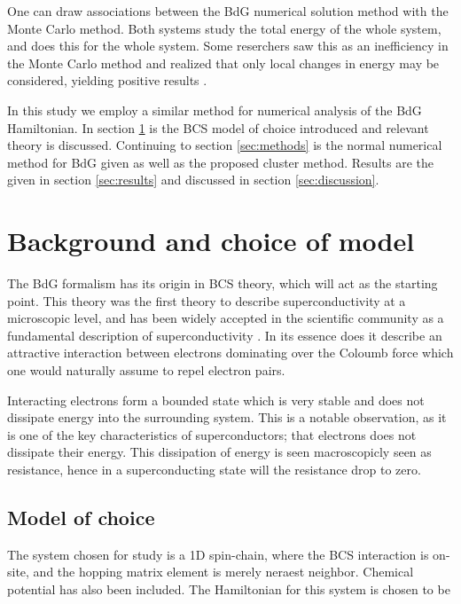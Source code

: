 \documentclass[11pt]{article}
\begin{document}
One can draw associations between the BdG numerical solution method with the Monte Carlo method. Both systems study the total energy of the whole system, and does this for the whole system. Some reserchers saw this as an inefficiency in the Monte Carlo method and realized that only local changes in energy may be considered, yielding positive results \cite{karmakarDisorderStabilizedBreachedpair2022, kumarTravellingClusterApproximation2006}.

In this study we employ a similar method for numerical analysis of the BdG Hamiltonian. In section \ref{sec:background} is the BCS model of choice introduced and relevant theory is discussed. Continuing to section \ref{sec:methods} is the normal numerical method for BdG given as well as the proposed cluster method. Results are the given in section \ref{sec:results} and discussed in section \ref{sec:discussion}.  


\section{Background and choice of model}\label{sec:background}

The BdG formalism has its origin in BCS theory, which will act as the starting point. This theory was the first theory to describe superconductivity at a microscopic level, and has been widely accepted in the scientific community as a fundamental description of superconductivity \cite{girvinModernCondensedMatter2019, sharmaReviewTheoriesSuperconductivity2015}. In its essence does it describe an attractive interaction between electrons dominating over the Coloumb force which one would naturally assume to repel electron pairs. 

Interacting electrons form a bounded state which is very stable and does not dissipate energy into the surrounding system. This is a notable observation, as it is one of the key characteristics of superconductors; that electrons does not dissipate their energy. This dissipation of energy is seen macroscopicly seen as resistance, hence in a superconducting state will the resistance drop to zero.

\subsection{Model of choice}

The system chosen for study is a 1D spin-chain, where the BCS interaction is on-site, and the hopping matrix element is merely neraest neighbor. Chemical potential has also been included. The Hamiltonian for this system is chosen to be 
\end{document}
